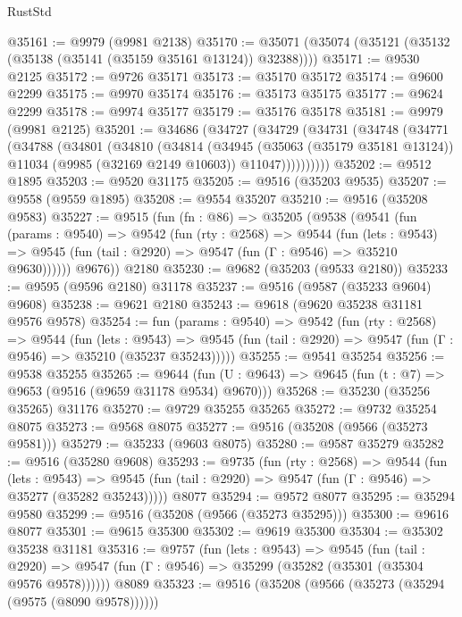 \begin{lexlean}{RustStd}
\begin{coremodule}
@35161 := @9979 (@9981 @2138)
@35170 := @35071 (@35074 (@35121 (@35132 (@35138 (@35141 (@35159 @35161 @13124)) @32388))))
@35171 := @9530 @2125
@35172 := @9726 @35171
@35173 := @35170 @35172
@35174 := @9600 @2299
@35175 := @9970 @35174
@35176 := @35173 @35175
@35177 := @9624 @2299
@35178 := @9974 @35177
@35179 := @35176 @35178
@35181 := @9979 (@9981 @2125)
@35201 := @34686
    (@34727
      (@34729
        (@34731
          (@34748
            (@34771
              (@34788
                (@34801
                  (@34810
                    (@34814
                      (@34945
                        (@35063 (@35179 @35181 @13124))
                        @11034
                        (@9985 (@32169 @2149 @10603))
                        @11047))))))))))
@35202 := @9512 @1895
@35203 := @9520 @31175
@35205 := @9516 (@35203 @9535)
@35207 := @9558 (@9559 @1895)
@35208 := @9554 @35207
@35210 := @9516 (@35208 @9583)
@35227 := @9515
    (fun (fn : @86) =>
    @35205
      (@9538
        (@9541
          (fun (params : @9540) =>
          @9542
            (fun (rty : @2568) =>
            @9544
              (fun (lets : @9543) =>
              @9545 (fun (tail : @2920) => @9547 (fun (Γ : @9546) => @35210 @9630))))))
        @9676))
    @2180
@35230 := @9682 (@35203 (@9533 @2180))
@35233 := @9595 (@9596 @2180) @31178
@35237 := @9516 (@9587 (@35233 @9604) @9608)
@35238 := @9621 @2180
@35243 := @9618 (@9620 @35238 @31181 @9576 @9578)
@35254 := fun (params : @9540) =>
  @9542
    (fun (rty : @2568) =>
    @9544
      (fun (lets : @9543) =>
      @9545 (fun (tail : @2920) => @9547 (fun (Γ : @9546) => @35210 (@35237 @35243)))))
@35255 := @9541 @35254
@35256 := @9538 @35255
@35265 := @9644
    (fun (U : @9643) => @9645 (fun (t : @7) => @9653 (@9516 (@9659 @31178 @9534) @9670)))
@35268 := @35230 (@35256 @35265) @31176
@35270 := @9729 @35255 @35265
@35272 := @9732 @35254 @8075
@35273 := @9568 @8075
@35277 := @9516 (@35208 (@9566 (@35273 @9581)))
@35279 := @35233 (@9603 @8075)
@35280 := @9587 @35279
@35282 := @9516 (@35280 @9608)
@35293 := @9735
    (fun (rty : @2568) =>
    @9544
      (fun (lets : @9543) =>
      @9545 (fun (tail : @2920) => @9547 (fun (Γ : @9546) => @35277 (@35282 @35243)))))
    @8077
@35294 := @9572 @8077
@35295 := @35294 @9580
@35299 := @9516 (@35208 (@9566 (@35273 @35295)))
@35300 := @9616 @8077
@35301 := @9615 @35300
@35302 := @9619 @35300
@35304 := @35302 @35238 @31181
@35316 := @9757
    (fun (lets : @9543) =>
    @9545
      (fun (tail : @2920) =>
      @9547 (fun (Γ : @9546) => @35299 (@35282 (@35301 (@35304 @9576 @9578))))))
    @8089
@35323 := @9516 (@35208 (@9566 (@35273 (@35294 (@9575 (@8090 @9578))))))

\end{coremodule}
\end{lexlean}

